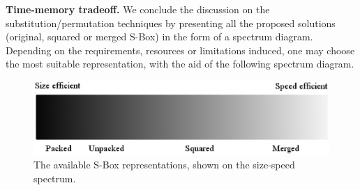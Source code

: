 \documentclass[11pt]{article}
\begin{document}
\textbf{Time-memory tradeoff.} We conclude the discussion on the substitution/permutation techniques by presenting all the proposed solutions (original, squared or merged S-Box) in the form of a spectrum diagram. Depending on the requirements, resources or limitations induced, one may choose the most suitable representation, with the aid of the following spectrum diagram.
\begin{figure}[h]
\centering
\includegraphics[scale=0.3]{spectrum}
\caption{\footnotesize The available S-Box representations, shown on the size-speed spectrum.}
\end{figure}
 

\end{document}
